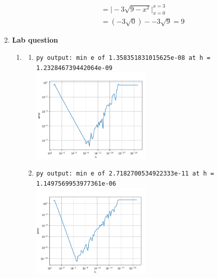 \documentclass[11pt]{article}
\begin{document}
\begin{preview}
\begin{enumerate}
\begin{enumerate}
\begin{align*}
                                               & = \Big| -3\sqrt{9-x^2} \Big|_{x=0}^{x=3}                                                      \\
                                               & = (-3\sqrt{0}) - -3\sqrt{9} = 9
                  \end{align*}
              \end{enumerate}
        \item \textbf{Lab question}
              \begin{enumerate}
                  \item
                        \begin{enumerate}
                            \item \texttt{py output: min e of 1.358351831015625e-08 at h = 1.232846739442064e-09} \\
                                  \includegraphics[width=0.5\textwidth]{fig/4ai.png}

                            \item \texttt{py output: min e of 2.7182700534922333e-11 at h = 1.1497569953977361e-06} \\
                                  \includegraphics[width=0.5\textwidth]{fig/4aii.png}


\end{enumerate}
\end{enumerate}
\end{enumerate}
\end{preview}
\end{document}
